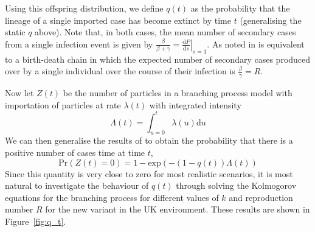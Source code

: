 \documentclass[10pt,a4paper]{article}
\newcommand{\be}{\begin{equation}}
\newcommand{\ee}{\end{equation}}
\begin{document}
Using this offspring distribution, we define $q(t)$ as the probability that the
lineage of a single imported case has become extinct by time $t$ (generalising
the static $q$ above). Note that, in both cases, the mean number of secondary
cases from a single infection event is given by $\frac{\beta}{\beta+\gamma} =
\left.\frac{{\mathrm{d}}P}{{\mathrm{d}}s}\right|_{s=1}$. As noted in
\citet{Dorman:2004} is equivalent to a birth-death chain in which the expected
number of secondary cases produced over by a single individual over the course
of their infection is $\frac{\beta}{\gamma} = R$.

Now let $Z(t)$ be the number of particles in a branching process model with
importation of particles at rate $\lambda(t)$ with integrated intensity 
\be
\Lambda(t) = \int_{u=0}^{t} \lambda(u) \mathrm{d}u
\ee
We can then generalise the results of \citeauthor{ScaliaTomba:2008} to obtain
the probability that there is a positive number of cases time at time $t$,
\be
\mathrm{Pr}(Z(t) = 0) = 1 - {\mathrm{exp}}(-(1 - q(t))\Lambda(t))
\label{Z0}
\ee
Since this quantity is very close to zero for most realistic scenarios, it is
most natural to investigate the behaviour of $q(t)$ through solving the
Kolmogorov equations for the branching process for different values of $k$ and
reproduction number $R$ for the new variant in the UK environment. These
results are shown in Figure~\ref{fig:q_t}.




\clearpage
\end{document}
